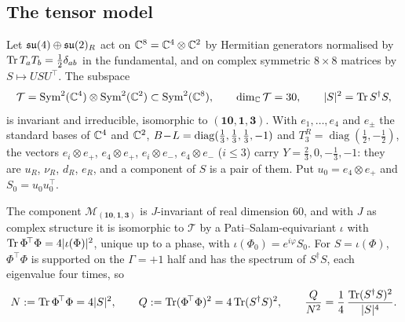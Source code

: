 \subsection{The tensor model}

Let $\mathfrak{su}(4)\oplus\mathfrak{su}(2)_R$ act on $\mathbb{C}^8=\mathbb{C}^4\otimes\mathbb{C}^2$ by Hermitian generators normalised by $\operatorname{Tr} T_aT_b=\tfrac12\delta_{ab}$ in the fundamental, and on complex
symmetric $8\times8$ matrices by $S\mapsto USU^{\!\top}$. The subspace
\[
\mathcal T=\mathrm{Sym}^2(\mathbb{C}^4)\otimes\mathrm{Sym}^2(\mathbb{C}^2)\subset\mathrm{Sym}^2(\mathbb{C}^8),\qquad \dim_{\mathbb{C}}\mathcal T=30,\qquad |S|^2=\operatorname{Tr} S^\dagger S,
\]
is invariant and irreducible, isomorphic to $(\mathbf{10},\mathbf1,\mathbf3)$. With $e_1,\dots,e_4$ and $e_\pm$ the standard bases of $\mathbb{C}^4$ and $\mathbb{C}^2$, $B\!-\!L=\operatorname{diag}(\tfrac13,\tfrac13,\tfrac13,-1)$
and $T^R_3=\operatorname{diag}(\tfrac12,-\tfrac12)$, the vectors $e_i\otimes e_+$, $e_4\otimes e_+$, $e_i\otimes e_-$, $e_4\otimes e_-$ ($i\le3$) carry $Y=\tfrac23,0,-\tfrac13,-1$:
they are $u_R$, $\nu_R$, $d_R$, $e_R$, and a component of $S$ is a pair of them. Put $u_0=e_4\otimes e_+$ and $S_0=u_0u_0^{\!\top}$.

\begin{proposition}
\label{prop:tensor}
The component $\mathcal M_{(\mathbf{10},\mathbf1,\mathbf3)}$ is $J$-invariant of real dimension $60$, and with $J$ as complex structure it is isomorphic to $\mathcal T$ by a
Pati--Salam-equivariant $\iota$ with $\operatorname{Tr}\Phi^{\!\top}\Phi=4|\iota(\Phi)|^2$, unique up to a phase, with $\iota(\Phi_0)=e^{i\varphi}S_0$. For
$S=\iota(\Phi)$, $\Phi^{\!\top}\Phi$ is supported on the $\Gamma=+1$ half and has the spectrum of $S^\dagger S$, each eigenvalue four times, so
\[
N:=\operatorname{Tr}\Phi^{\!\top}\Phi=4|S|^2,\qquad Q:=\operatorname{Tr}(\Phi^{\!\top}\Phi)^2=4\operatorname{Tr}(S^\dagger S)^2,\qquad \frac Q{N^2}=\frac14\,\frac{\operatorname{Tr}(S^\dagger S)^2}{|S|^4}.
\]
\end{proposition}

